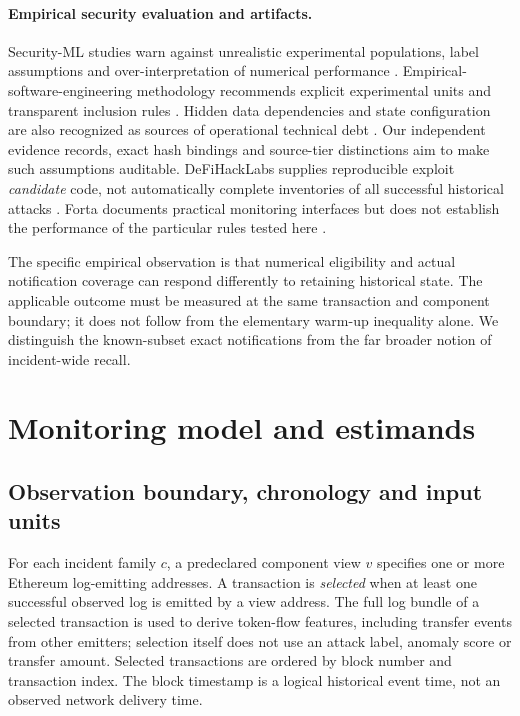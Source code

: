\documentclass[preprint,12pt,authoryear]{elsarticle}
\begin{document}
\paragraph{Empirical security evaluation and artifacts.} Security-ML studies warn against unrealistic experimental populations, label assumptions and over-interpretation of numerical performance \citep{Sommer2010ClosedWorld,Arp2022Dons}. Empirical-software-engineering methodology recommends explicit experimental units and transparent inclusion rules \citep{Kitchenham2004Evidence,Wohlin2012Experimentation}. Hidden data dependencies and state configuration are also recognized as sources of operational technical debt \citep{Sculley2015Debt}. Our independent evidence records, exact hash bindings and source-tier distinctions aim to make such assumptions auditable. DeFiHackLabs supplies reproducible exploit \emph{candidate} code, not automatically complete inventories of all successful historical attacks \citep{DeFiHackLabs2026}. Forta documents practical monitoring interfaces but does not establish the performance of the particular rules tested here \citep{FortaDocs}.

The specific empirical observation is that numerical eligibility and actual notification coverage can respond differently to retaining historical state. The applicable outcome must be measured at the same transaction and component boundary; it does not follow from the elementary warm-up inequality alone. We distinguish the known-subset exact notifications from the far broader notion of incident-wide recall.

\section{Monitoring model and estimands}\label{sec:model}

\subsection{Observation boundary, chronology and input units}
For each incident family $c$, a predeclared component view $v$ specifies one or more Ethereum log-emitting addresses. A transaction is \emph{selected} when at least one successful observed log is emitted by a view address. The full log bundle of a selected transaction is used to derive token-flow features, including transfer events from other emitters; selection itself does not use an attack label, anomaly score or transfer amount. Selected transactions are ordered by block number and transaction index. The block timestamp is a logical historical event time, not an observed network delivery time.
\end{document}
